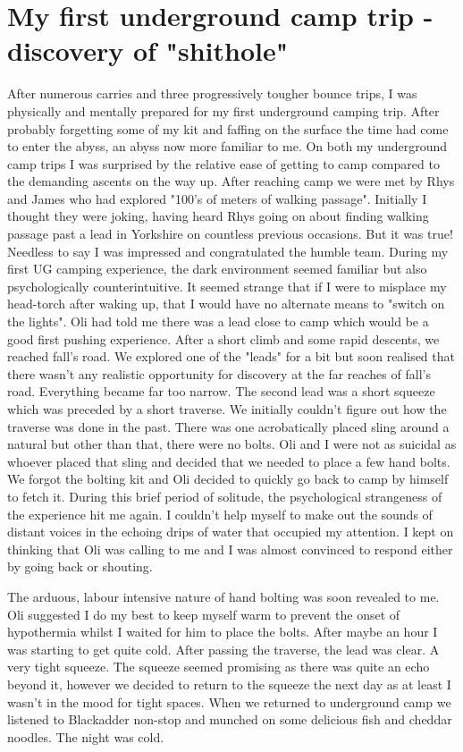 \section{My first underground camp trip - discovery of "shithole"}

After numerous carries and three progressively tougher bounce trips, I was physically and
mentally prepared for my first underground camping trip. After probably forgetting some of my kit and faffing on the surface the time had come to enter the abyss, an abyss now more familiar to me. On both my underground camp trips I was surprised by the relative ease of getting to camp compared to the demanding ascents on the way up. After reaching camp we were met by Rhys and James who had explored "100's of meters of walking passage". Initially I thought they were joking, having heard Rhys going on about finding walking passage past a lead in Yorkshire on countless previous occasions. But it was true! Needless to say I was impressed and congratulated the humble team. During my first UG camping experience, the dark environment seemed familiar but also psychologically counterintuitive. It seemed strange that if I were to misplace my head-torch after waking up, that I would have no alternate means to "switch on the lights". Oli had told me there was a lead close to camp which would be a good first pushing experience. After a short climb and some rapid descents, we reached fall's road. We explored one of the "leads" for a bit but soon realised that there wasn't any realistic opportunity for discovery at the far reaches of fall's road. Everything became far too narrow. The second lead was a short squeeze which was preceded by a short traverse. We initially couldn't figure out how the traverse was done in the past. There was one acrobatically placed sling around a natural but other than that, there were no bolts. Oli and I were not as suicidal as whoever placed that sling and decided that we needed to place a few hand bolts. We forgot the bolting kit and Oli decided to quickly go back to camp by himself to fetch it. During this brief period of solitude, the psychological strangeness of the experience hit me again. I couldn't help myself to make out the sounds of distant voices in the echoing drips of water that occupied my attention. I kept on thinking that Oli was calling to me and I was almost convinced to respond either by going back or shouting.

The arduous, labour intensive nature of hand bolting was soon revealed to me. Oli suggested I do my best to keep myself warm to prevent the onset of hypothermia whilst I waited for him to place the bolts. After maybe an hour I was starting to get quite cold. After passing the traverse, the lead was clear. A very tight squeeze. The squeeze seemed promising as there was quite an echo beyond it, however we decided to return to the squeeze the next day as at least I wasn’t in the mood for tight spaces. When we returned to underground camp we listened to Blackadder non-stop and munched on some delicious fish and cheddar noodles. The night was cold. 

